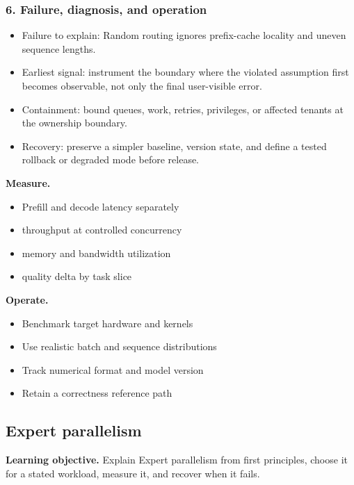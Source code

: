 \subsubsection*{6. Failure, diagnosis, and operation}
\begin{itemize}
\item Failure to explain: Random routing ignores prefix-cache locality and uneven sequence lengths.
\item Earliest signal: instrument the boundary where the violated assumption first becomes observable, not only the final user-visible error.
\item Containment: bound queues, work, retries, privileges, or affected tenants at the ownership boundary.
\item Recovery: preserve a simpler baseline, version state, and define a tested rollback or degraded mode before release.
\end{itemize}
\textbf{Measure.}\begin{itemize}
\item Prefill and decode latency separately
\item throughput at controlled concurrency
\item memory and bandwidth utilization
\item quality delta by task slice
\end{itemize}
\textbf{Operate.}\begin{itemize}
\item Benchmark target hardware and kernels
\item Use realistic batch and sequence distributions
\item Track numerical format and model version
\item Retain a correctness reference path
\end{itemize}
\subsection{Expert parallelism}
\textbf{Learning objective.} Explain Expert parallelism from first principles, choose it for a stated workload, measure it, and recover when it fails.
